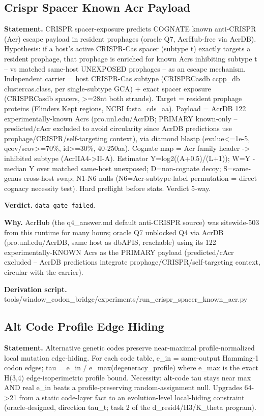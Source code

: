\subsection{Crispr Spacer Known Acr Payload}\label{sec:bridge-crispr-spacer-known-acr-payload}
\textbf{Statement.} CRISPR spacer-exposure predicts COGNATE known anti-CRISPR (Acr) escape payload in resident prophages
(oracle Q7, AcrHub-free via AcrDB). Hypothesis: if a host's active CRISPR-Cas spacer (subtype t)
exactly targets a resident prophage, that prophage is enriched for known Acrs inhibiting subtype t
-- vs matched same-host UNEXPOSED prophages -- as an escape mechanism. Independent carrier = host
CRISPR-Cas subtype (CRISPRCasdb ccpp\_db clustercas.class, per single-subtype GCA) + exact spacer
exposure (CRISPRCasdb spacers, >=28nt both strands). Target = resident prophage proteins (Flinders
Kept regions, NCBI fasta\_cds\_aa). Payload = AcrDB 122 experimentally-known Acrs
(pro.unl.edu/AcrDB; PRIMARY known-only -- predicted/cAcr excluded to avoid circularity since AcrDB
predictions use prophage/CRISPR/self-targeting context), via diamond blastp (evalue<=1e-5,
qcov/scov>=70\%, id>=30\%, 40-250aa). Cognate map = Acr family header -> inhibited subtype
(AcrIIA4->II-A). Estimator Y=log2((A+0.5)/(L+1)); W=Y - median Y over matched same-host unexposed;
D=non-cognate decoy; S=same-genus cross-host swap; N1-N6 nulls (N6=Acr-subtype-label permutation =
direct cognacy necessity test). Hard preflight before stats. Verdict 5-way.

\textbf{Verdict.} \texttt{data\_gate\_failed}.

\textbf{Why.} AcrHub (the q4\_answer.md default anti-CRISPR source) was sitewide-503 from this runtime for many
hours; oracle Q7 unblocked Q4 via AcrDB (pro.unl.edu/AcrDB, same host as dbAPIS, reachable) using
its 122 experimentally-KNOWN Acrs as the PRIMARY payload (predicted/cAcr excluded -- AcrDB
predictions integrate prophage/CRISPR/self-targeting context, circular with the carrier).

\textbf{Derivation script.} tools/window\_codon\_bridge/experiments/run\_crispr\_spacer\_known\_acr.py

\subsection{Alt Code Profile Edge Hiding}\label{sec:bridge-alt-code-profile-edge-hiding}
\textbf{Statement.} Alternative genetic codes preserve near-maximal profile-normalized local mutation edge-hiding. For
each code table, e\_in = same-output Hamming-1 codon edges; tau = e\_in /
e\_max(degeneracy\_profile) where e\_max is the exact H(3,4) edge-isoperimetric profile bound.
Necessity: alt-code tau stays near max AND real e\_in beats a profile-preserving random-assignment
null. Upgrades 64->21 from a static code-layer fact to an evolution-level local-hiding constraint
(oracle-designed, direction tau\_t; task 2 of the d\_resid4/H3/K\_theta program).

